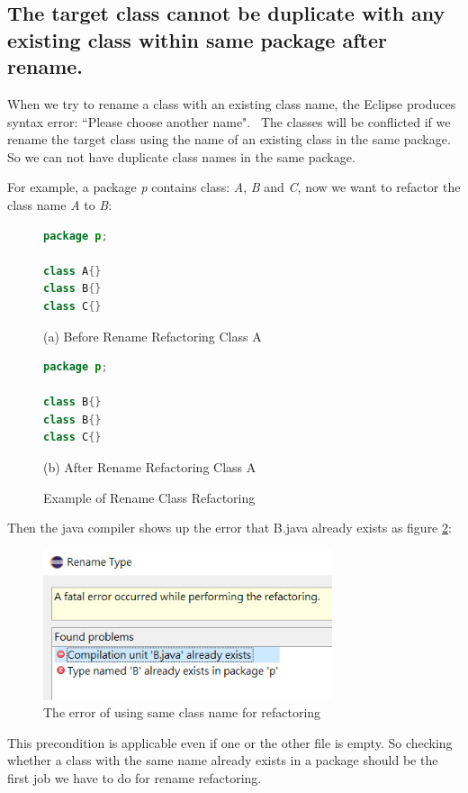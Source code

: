 \subsection{The target class cannot be duplicate with any existing class within same package after rename.}

When we try to rename a class with an existing class name, the Eclipse produces syntax error:
``Please choose another name".~\cite{EclipseWebPage} The classes will be conflicted if we rename the target class using the name of an existing class in the same package. So we can not have duplicate class names in the same package. 

For example, a package \textsl{p} contains class: \textsl{A}, \textsl{B} and \textsl{C}, now we want to refactor the class name \textsl{A} to \textsl{B}:

\begin{figure}[th]
\centering
\begin{minipage}[t]{0.35\linewidth}
\begin{lstlisting}[language=java, basicstyle=\scriptsize\ttfamily,frame=single]
package p;

class A{}	
class B{}
class C{}
\end{lstlisting}
\tiny{(a) Before Rename Refactoring Class A}
\end{minipage}
\hfill
\begin{minipage}[t]{0.35\linewidth}
\begin{lstlisting}[language=java, basicstyle=\scriptsize\ttfamily,frame=single]
package p;

class B{}	
class B{}
class C{}

\end{lstlisting}
\tiny{(b) After Rename Refactoring Class A}
\end{minipage}
\caption{Example of Rename Class Refactoring}
\label{fig:afterrr}
\end{figure}

Then the java compiler shows up the error that B.java already exists as figure \ref{fig:renameclassname}:

\begin{figure}[H]
\centerline{\includegraphics[width=85mm,scale=0.5]{SCN.jpg}}
\caption{The error of using same class name for refactoring}
\label{fig:renameclassname}
\end{figure}

This precondition is applicable even if one or the other file is empty. So checking whether a class with the same name already exists in a package should be the first job we have to do for rename refactoring. 
